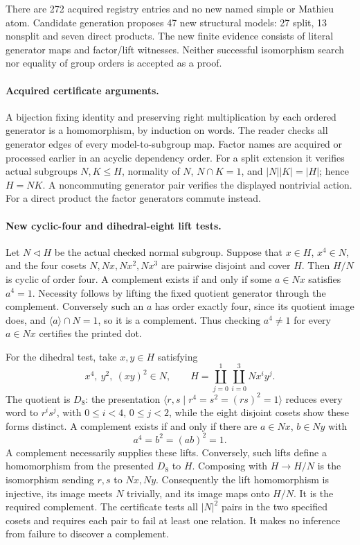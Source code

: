 \documentclass[11pt]{article}
\begin{document}
There are 272 acquired registry entries and no new named simple or Mathieu
atom. Candidate generation proposes 47 new structural models: 27 split,
13 nonsplit and seven direct products. The new finite evidence consists
of literal generator maps and factor/lift witnesses. Neither successful
isomorphism search nor equality of group orders is accepted as a proof.

\paragraph{Acquired certificate arguments.}
A bijection fixing identity and preserving right multiplication by each
ordered generator is a homomorphism, by induction on words. The reader
checks all generator edges of every model-to-subgroup map. Factor names
are acquired or processed earlier in an acyclic dependency order.
For a split extension it verifies actual subgroups $N,K\le H$, normality
of $N$, $N\cap K=1$, and $|N||K|=|H|$; hence $H=NK$.
A noncommuting generator pair verifies the displayed nontrivial action.
For a direct product the factor generators commute instead.
\newpage
\paragraph{New cyclic-four and dihedral-eight lift tests.}
Let $N\mathrel{\triangleleft}H$ be the actual checked normal subgroup.
Suppose that $x\in H$, $x^4\in N$, and the four cosets
$N,Nx,Nx^2,Nx^3$ are pairwise disjoint and cover $H$.
Then $H/N$ is cyclic of order four. A complement exists if and only if
some $a\in Nx$ satisfies $a^4=1$. Necessity follows by lifting the fixed
quotient generator through the complement. Conversely such an $a$ has
order exactly four, since its quotient image does, and
$\langle a\rangle\cap N=1$, so it is a complement.
Thus checking $a^4\ne1$ for every $a\in Nx$ certifies the printed dot.

For the dihedral test, take $x,y\in H$ satisfying
\[
 x^4,\ y^2,\ (xy)^2\in N,
 \qquad
 H=\coprod_{j=0}^{1}\coprod_{i=0}^{3}Nx^iy^j.
\]
The quotient is $D_8$: the presentation
$\langle r,s\mid r^4=s^2=(rs)^2=1\rangle$ reduces every word to
$r^is^j$, with $0\le i<4$, $0\le j<2$, while the eight disjoint
cosets show these forms distinct. A complement exists if and only if
there are $a\in Nx$, $b\in Ny$ with
\[
 a^4=b^2=(ab)^2=1.
\]
A complement necessarily supplies these lifts. Conversely, such lifts
define a homomorphism from the presented $D_8$ to $H$. Composing with
$H\to H/N$ is the isomorphism sending $r,s$ to $Nx,Ny$.
Consequently the lift homomorphism is injective, its image meets $N$
trivially, and its image maps onto $H/N$. It is the required complement.
The certificate tests all $|N|^2$ pairs in the two specified cosets and
requires each pair to fail at least one relation. It makes no inference
from failure to discover a complement.
\end{document}
